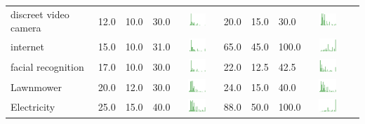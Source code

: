 \begin{table}[t]
\begin{center}
\begin{tabular}{| p{2cm} | p{1cm} | p{1cm} | p{1cm} | c | p{2cm} | p{1cm} | p{1cm} | p{1cm} | c |}
discreet video camera & 12.0 & 10.0 & 30.0 & \includegraphics[width = 2cm, height = 0.5cm]{tables/discreetvideocamerarisk} & 20.0 & 15.0 & 30.0 & \includegraphics[width = 2cm, height = 0.5cm]{tables/discreetvideocameraben} \\ 
internet & 15.0 & 10.0 & 31.0 & \includegraphics[width = 2cm, height = 0.5cm]{tables/internetrisk} & 65.0 & 45.0 & 100.0 & \includegraphics[width = 2cm, height = 0.5cm]{tables/internetben} \\ 
facial recognition & 17.0 & 10.0 & 30.0 & \includegraphics[width = 2cm, height = 0.5cm]{tables/facialrecognitionrisk} & 22.0 & 12.5 & 42.5 & \includegraphics[width = 2cm, height = 0.5cm]{tables/facialrecognitionben} \\ 

Lawnmower & 20.0 & 12.0 & 30.0 & \includegraphics[width = 2cm, height = 0.5cm]{tables/LawnmowerRisk} & 24.0 & 15.0 & 40.0 & \includegraphics[width = 2cm, height = 0.5cm]{tables/LawnmowerBenefit} \\ 
Electricity & 25.0 & 15.0 & 40.0 & \includegraphics[width = 2cm, height = 0.5cm]{tables/ElectricityRisk} & 88.0 & 50.0 & 100.0 & \includegraphics[width = 2cm, height = 0.5cm]{tables/ElectricityBenefit} \\ 


\end{tabular}
\end{center}
\end{table}
